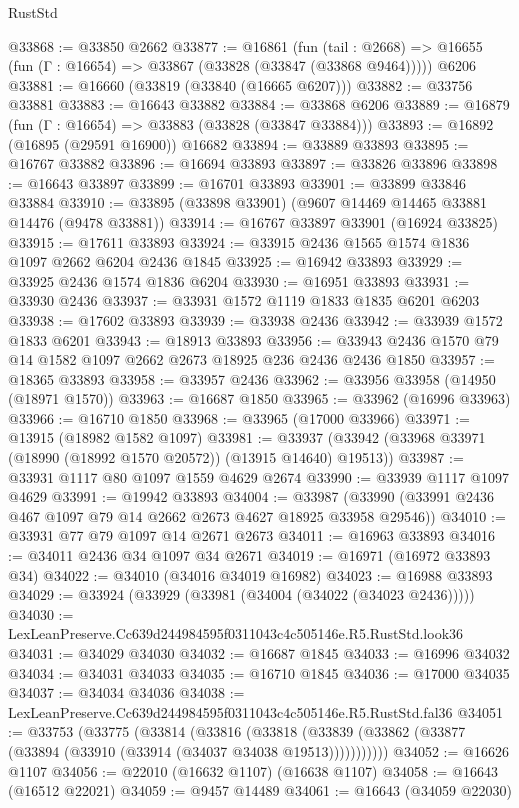 \begin{lexlean}{RustStd}
\begin{coremodule}
@33868 := @33850 @2662
@33877 := @16861
    (fun (tail : @2668) => @16655 (fun (Γ : @16654) => @33867 (@33828 (@33847 (@33868 @9464)))))
    @6206
@33881 := @16660 (@33819 (@33840 (@16665 @6207)))
@33882 := @33756 @33881
@33883 := @16643 @33882
@33884 := @33868 @6206
@33889 := @16879 (fun (Γ : @16654) => @33883 (@33828 (@33847 @33884)))
@33893 := @16892 (@16895 (@29591 @16900)) @16682
@33894 := @33889 @33893
@33895 := @16767 @33882
@33896 := @16694 @33893
@33897 := @33826 @33896
@33898 := @16643 @33897
@33899 := @16701 @33893
@33901 := @33899 @33846 @33884
@33910 := @33895 (@33898 @33901) (@9607 @14469 @14465 @33881 @14476 (@9478 @33881))
@33914 := @16767 @33897 @33901 (@16924 @33825)
@33915 := @17611 @33893
@33924 := @33915 @2436 @1565 @1574 @1836 @1097 @2662 @6204 @2436 @1845
@33925 := @16942 @33893
@33929 := @33925 @2436 @1574 @1836 @6204
@33930 := @16951 @33893
@33931 := @33930 @2436
@33937 := @33931 @1572 @1119 @1833 @1835 @6201 @6203
@33938 := @17602 @33893
@33939 := @33938 @2436
@33942 := @33939 @1572 @1833 @6201
@33943 := @18913 @33893
@33956 := @33943 @2436 @1570 @79 @14 @1582 @1097 @2662 @2673 @18925 @236 @2436 @2436 @1850
@33957 := @18365 @33893
@33958 := @33957 @2436
@33962 := @33956 @33958 (@14950 (@18971 @1570))
@33963 := @16687 @1850
@33965 := @33962 (@16996 @33963)
@33966 := @16710 @1850
@33968 := @33965 (@17000 @33966)
@33971 := @13915 (@18982 @1582 @1097)
@33981 := @33937 (@33942 (@33968 @33971 (@18990 (@18992 @1570 @20572)) (@13915 @14640) @19513))
@33987 := @33931 @1117 @80 @1097 @1559 @4629 @2674
@33990 := @33939 @1117 @1097 @4629
@33991 := @19942 @33893
@34004 := @33987 (@33990 (@33991 @2436 @467 @1097 @79 @14 @2662 @2673 @4627 @18925 @33958 @29546))
@34010 := @33931 @77 @79 @1097 @14 @2671 @2673
@34011 := @16963 @33893
@34016 := @34011 @2436 @34 @1097 @34 @2671
@34019 := @16971 (@16972 @33893 @34)
@34022 := @34010 (@34016 @34019 @16982)
@34023 := @16988 @33893
@34029 := @33924 (@33929 (@33981 (@34004 (@34022 (@34023 @2436)))))
@34030 := LexLeanPreserve.Cc639d244984595f0311043c4c505146e.R5.RustStd.look36
@34031 := @34029 @34030
@34032 := @16687 @1845
@34033 := @16996 @34032
@34034 := @34031 @34033
@34035 := @16710 @1845
@34036 := @17000 @34035
@34037 := @34034 @34036
@34038 := LexLeanPreserve.Cc639d244984595f0311043c4c505146e.R5.RustStd.fal36
@34051 := @33753
    (@33775
      (@33814
        (@33816
          (@33818 (@33839 (@33862 (@33877 (@33894 (@33910 (@33914 (@34037 @34038 @19513)))))))))))
@34052 := @16626 @1107
@34056 := @22010 (@16632 @1107) (@16638 @1107)
@34058 := @16643 (@16512 @22021)
@34059 := @9457 @14489
@34061 := @16643 (@34059 @22030)

\end{coremodule}
\end{lexlean}
